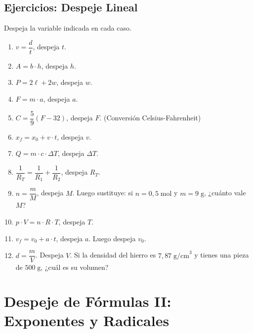 \documentclass[12pt, letterpaper]{article}
\begin{document}
\subsection{Ejercicios: Despeje Lineal}
Despeja la variable indicada en cada caso.

\begin{enumerate}[leftmargin=*]
  \item \facil{} $v = \dfrac{d}{t}$, despeja $t$.

  \item \facil{} $A = b \cdot h$, despeja $h$.

  \item \facil{} $P = 2\ell + 2w$, despeja $w$.

  \item \facil{} $F = m \cdot a$, despeja $a$.

  \item \medio{} $C = \dfrac{5}{9}(F - 32)$, despeja $F$. (Conversión Celsius-Fahrenheit)

  \item \medio{} $x_f = x_0 + v \cdot t$, despeja $v$.

  \item \medio{} $Q = m \cdot c \cdot \Delta T$, despeja $\Delta T$.

  \item \medio{} $\dfrac{1}{R_T} = \dfrac{1}{R_1} + \dfrac{1}{R_2}$, despeja $R_T$.

  \item \dificil{} $n = \dfrac{m}{M}$, despeja $M$. Luego sustituye: si $n = 0{,}5\;\text{mol}$ y $m = 9\;\text{g}$, ¿cuánto vale $M$?

  \item \dificil{} $p \cdot V = n \cdot R \cdot T$, despeja $T$.

  \item \dificil{} $v_f = v_0 + a \cdot t$, despeja $a$. Luego despeja $v_0$.

  \item \dificil{} $d = \dfrac{m}{V}$. Despeja $V$. Si la densidad del hierro es $7{,}87\;\text{g/cm}^3$ y tienes una pieza de $500\;\text{g}$, ¿cuál es su volumen?
\end{enumerate}

\newpage

\section{Despeje de Fórmulas II: Exponentes y Radicales}
\end{document}
